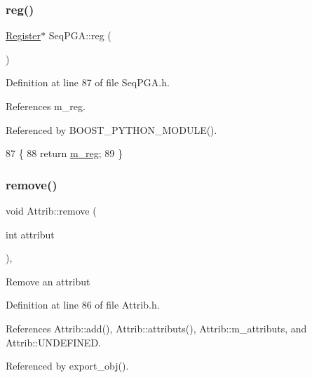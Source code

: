 \subsubsection{\texorpdfstring{reg()}{reg()}}
{\footnotesize\ttfamily \hyperlink{classRegister}{Register}$\ast$ Seq\+P\+G\+A\+::reg (\begin{DoxyParamCaption}{ }\end{DoxyParamCaption})\hspace{0.3cm}{\ttfamily [inline]}}



Definition at line 87 of file Seq\+P\+G\+A.\+h.



References m\+\_\+reg.



Referenced by B\+O\+O\+S\+T\+\_\+\+P\+Y\+T\+H\+O\+N\+\_\+\+M\+O\+D\+U\+L\+E().


\begin{DoxyCode}
87                  \{
88     \textcolor{keywordflow}{return} \hyperlink{classSeqPGA_afd827f1d3d55b0a8efafbd79a8c54a52}{m\_reg};
89   \}
\end{DoxyCode}
\mbox{\label{classAttrib_a7d4ef7e32d93cb287792b87b857e79f3}} 
\subsubsection{\texorpdfstring{remove()}{remove()}}
{\footnotesize\ttfamily void Attrib\+::remove (\begin{DoxyParamCaption}\item[{int}]{attribut }\end{DoxyParamCaption})\hspace{0.3cm}{\ttfamily [inline]}, {\ttfamily [inherited]}}

Remove an attribut 

Definition at line 86 of file Attrib.\+h.



References Attrib\+::add(), Attrib\+::attributs(), Attrib\+::m\+\_\+attributs, and Attrib\+::\+U\+N\+D\+E\+F\+I\+N\+ED.



Referenced by export\+\_\+obj().


